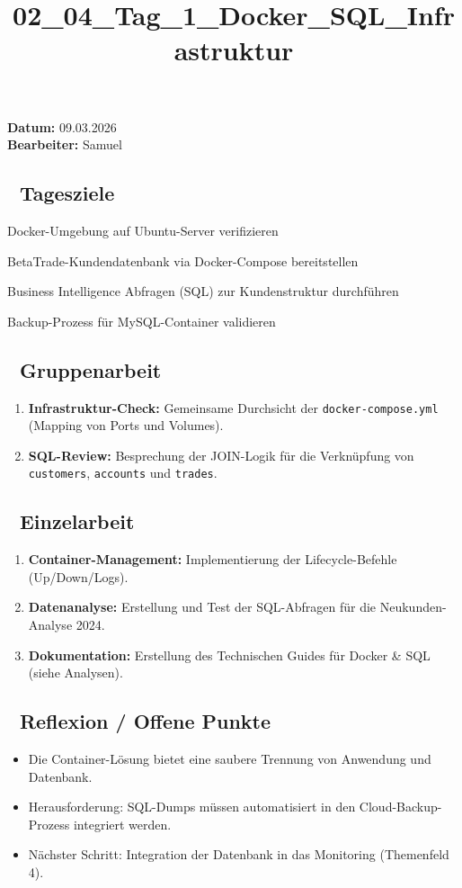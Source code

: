 \documentclass[
]{article}
\title{02\_04\_Tag\_1\_Docker\_SQL\_Infrastruktur}
\author{}
\date{}
\providecommand{\tightlist}{%
  \setlength{\itemsep}{0pt}\setlength{\parskip}{0pt}}
\begin{document}
\maketitle

\textbf{Datum:} 09.03.2026\\
\textbf{Bearbeiter:} Samuel

\subsection{🎯 Tagesziele}\label{tagesziele}

Docker-Umgebung auf Ubuntu-Server verifizieren

BetaTrade-Kundendatenbank via Docker-Compose bereitstellen

Business Intelligence Abfragen (SQL) zur Kundenstruktur durchführen

Backup-Prozess für MySQL-Container validieren

\subsection{👥 Gruppenarbeit}\label{gruppenarbeit}

\begin{enumerate}
\tightlist
\item
  \textbf{Infrastruktur-Check:} Gemeinsame Durchsicht der
  \texttt{docker-compose.yml} (Mapping von Ports und Volumes).
\item
  \textbf{SQL-Review:} Besprechung der JOIN-Logik für die Verknüpfung
  von \texttt{customers}, \texttt{accounts} und \texttt{trades}.
\end{enumerate}

\subsection{👤 Einzelarbeit}\label{einzelarbeit}

\begin{enumerate}
\tightlist
\item
  \textbf{Container-Management:} Implementierung der Lifecycle-Befehle
  (Up/Down/Logs).
\item
  \textbf{Datenanalyse:} Erstellung und Test der SQL-Abfragen für die
  Neukunden-Analyse 2024.
\item
  \textbf{Dokumentation:} Erstellung des Technischen Guides für Docker
  \& SQL (siehe Analysen).
\end{enumerate}

\subsection{📝 Reflexion / Offene Punkte}\label{reflexion-offene-punkte}

\begin{itemize}
\tightlist
\item
  Die Container-Lösung bietet eine saubere Trennung von Anwendung und
  Datenbank.
\item
  Herausforderung: SQL-Dumps müssen automatisiert in den
  Cloud-Backup-Prozess integriert werden.
\item
  Nächster Schritt: Integration der Datenbank in das Monitoring
  (Themenfeld 4).
\end{itemize}
\end{document}
